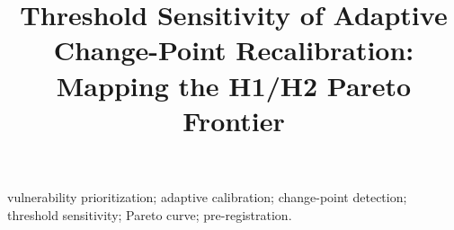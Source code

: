 \documentclass[journal]{IEEEtran}
\title{Threshold Sensitivity of Adaptive Change-Point Recalibration:
Mapping the H1/H2 Pareto Frontier}
\author{%
  \IEEEauthorblockN{Harshavardhan Malla}
  \IEEEauthorblockA{Independent Researcher}%
}
\begin{document}
\maketitle

\begin{abstract}

\end{abstract}

\begin{IEEEkeywords}
vulnerability prioritization; adaptive calibration; change-point
detection; threshold sensitivity; Pareto curve; pre-registration.
\end{IEEEkeywords}















\end{document}
